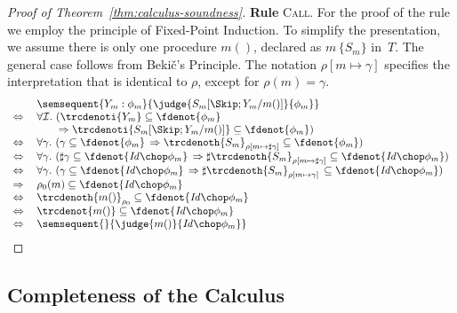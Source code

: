 \documentclass[a4paper,numberwithinsect]{lipics-v2021}
\begin{document}
\begin{proof}[Proof of Theorem~\ref{thm:calculus-soundness}]
\noindent\textbf{Rule} \textsc{Call}.
%
For the proof of the rule we employ the principle of Fixed-Point
Induction. %
%
To simplify the presentation, we assume there is only one procedure
$m()$, declared as $m\, \{S_m\}$ in~$T$.
%
The general case follows from Beki\v{c}'s Principle. The notation
$\rho [m\mapsto\gamma]$ specifies the interpretation that is identical
to $\rho$, except for $\rho(m)=\gamma$.
%
%
\[
  \begin{array}{ll}
   & 
   \semsequent{Y_m : \phi_m}{\judge{S_m [\Skip; Y_m / m()]}{\phi_m}} \\
   \Leftrightarrow\> & 
   \forall \mathcal{I}.\
                       (\trcdenoti{Y_m} \subseteq \fdenot{\phi_m}\,\\
    & \qquad\Rightarrow 
       \trcdenoti{S_m [\Skip; Y_m / m()]} \subseteq \fdenot{\phi_m}) \\
   \Leftrightarrow\> & 
   \forall \gamma.\
      (\gamma \subseteq \fdenot{\phi_m}\, \Rightarrow 
       \trcdenoth{S_m}_{\rho [m \mapsto \sharp \gamma]} 
       \subseteq \fdenot{\phi_m}) \\
   \Leftrightarrow\> & 
   \forall \gamma.\
      (\sharp \gamma \subseteq \fdenot{\mathit{Id} \chop \phi_m}\, \Rightarrow 
       \sharp \trcdenoth{S_m}_{\rho [m \mapsto \sharp \gamma]} 
       \subseteq \fdenot{\mathit{Id} \chop \phi_m}) \\
   \Leftrightarrow\> & 
   \forall \gamma.\
      (\gamma \subseteq \fdenot{\mathit{Id} \chop \phi_m}\, \Rightarrow 
       \sharp \trcdenoth{S_m}_{\rho [m \mapsto \gamma]}\, 
       \subseteq \fdenot{\mathit{Id} \chop \phi_m}) \\
   \Rightarrow\> & 
   \rho_0 (m) \subseteq \fdenot{\mathit{Id} \chop \phi_m} \\
   \Leftrightarrow\> & 
   \trcdenoth{m()}_{\rho_0} \subseteq \fdenot{\mathit{Id}\chop\phi_m} \\
   \Leftrightarrow\> & 
   \trcdenot{m()} \subseteq \fdenot{\mathit{Id}\chop\phi_m} \\
   \Leftrightarrow\> & 
   \semsequent{}{\judge{m()}{\mathit{Id}\chop\phi_m}} 
  \end{array}
\]
\end{proof}

\subsection{Completeness of the Calculus}
\label{sec:completeness-app}
\end{document}
